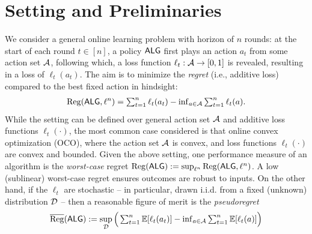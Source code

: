 \section{Setting and Preliminaries}
\label{ssec:setting}



We consider a general online learning problem with horizon of $n$ rounds: at the start of each round $t \in [n]$, a policy $\mathsf{ALG}$ first plays an action $a_t$ from some action set $\mathcal{A}$, following which, a loss function $\ell_t: \mathcal{A} \to [0,1]$ is revealed, resulting in a loss of $\ell_t(a_t)$. 
The aim is to minimize the \emph{regret} (i.e., additive loss) compared to the best fixed action in hindsight:
\begin{align}
\label{eq:RegDefnGeneral}
    \mathrm{Reg}(\mathsf{ALG},\ell^n) = \textstyle\sum_{t=1}^n \ell_t(a_t) - \inf_{a \in \mathcal{A}} \textstyle\sum_{t=1}^n \ell_t(a).
\end{align} 
While the setting can be defined over general action set $\mathcal{A}$ and additive loss functions $\ell_t(\cdot)$, the most common case considered  is that online convex optimization (OCO), where the action set $\mathcal{A}$ is convex, and loss functions $\ell_t(\cdot)$ are convex and bounded. 
Given the above setting, one performance measure of an algorithm is the \emph{worst-case} regret $\mathrm{Reg}(\mathsf{ALG}) \mathrel{\mathop{:}}= \sup_{\ell^n} \mathrm{Reg}(\mathsf{ALG},\ell^n)$. 
A low (sublinear) worst-case regret ensures outcomes are robust to inputs. On the other hand, if the $\ell_t$ are stochastic -- in particular, drawn i.i.d. from a fixed (unknown) distribution $\mathcal{D}$ -- then a reasonable figure of merit is the \emph{pseudoregret}
\begin{align*} %
    \PseudoReg(\alg) \defeq \sup_{\dist}\Big(\textstyle\sum_{t=1}^n \E[\ell_t(a_t)] - \inf_{a \in \Ac} \textstyle\sum_{t=1}^n \E[\ell_t(a)]\Big)
\end{align*}
\cite{kotlowski2018minimaxity}

